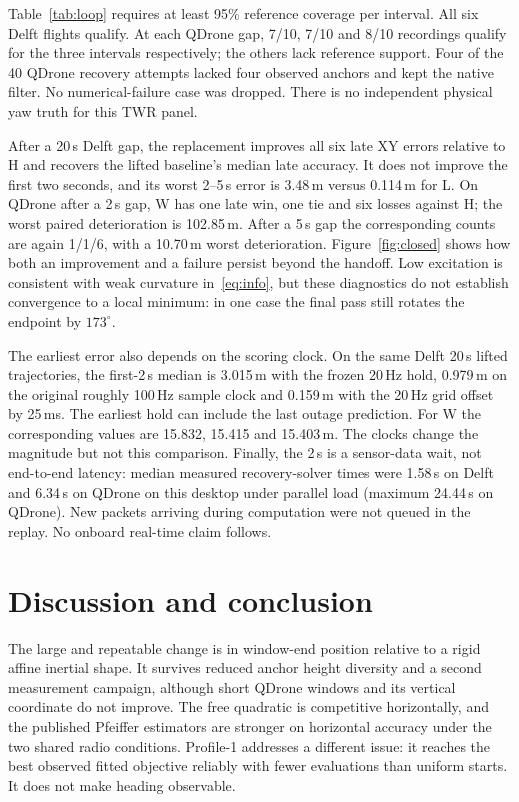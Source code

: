 \documentclass[conference,letterpaper,10pt]{IEEEtran}
\begin{document}
Table~\ref{tab:loop} requires at least 95\% reference coverage per interval. All six Delft flights qualify. At each QDrone gap, 7/10, 7/10 and 8/10 recordings qualify for the three intervals respectively; the others lack reference support. Four of the 40 QDrone recovery attempts lacked four observed anchors and kept the native filter. No numerical-failure case was dropped. There is no independent physical yaw truth for this TWR panel.

After a 20\,s Delft gap, the replacement improves all six late XY errors relative to H and recovers the lifted baseline's median late accuracy. It does not improve the first two seconds, and its worst 2--5\,s error is 3.48\,m versus 0.114\,m for L. On QDrone after a 2\,s gap, W has one late win, one tie and six losses against H; the worst paired deterioration is 102.85\,m. After a 5\,s gap the corresponding counts are again 1/1/6, with a 10.70\,m worst deterioration. Figure~\ref{fig:closed} shows how both an improvement and a failure persist beyond the handoff. Low excitation is consistent with weak curvature in~\eqref{eq:info}, but these diagnostics do not establish convergence to a local minimum: in one case the final pass still rotates the endpoint by $173^\circ$.

The earliest error also depends on the scoring clock. On the same Delft 20\,s lifted trajectories, the first-2\,s median is 3.015\,m with the frozen 20\,Hz hold, 0.979\,m on the original roughly 100\,Hz sample clock and 0.159\,m with the 20\,Hz grid offset by 25\,ms. The earliest hold can include the last outage prediction. For W the corresponding values are 15.832, 15.415 and 15.403\,m. The clocks change the magnitude but not this comparison. Finally, the 2\,s is a sensor-data wait, not end-to-end latency: median measured recovery-solver times were 1.58\,s on Delft and 6.34\,s on QDrone on this desktop under parallel load (maximum 24.44\,s on QDrone). New packets arriving during computation were not queued in the replay. No onboard real-time claim follows.

\section{Discussion and conclusion}
The large and repeatable change is in window-end position relative to a rigid affine inertial shape. It survives reduced anchor height diversity and a second measurement campaign, although short QDrone windows and its vertical coordinate do not improve. The free quadratic is competitive horizontally, and the published Pfeiffer estimators are stronger on horizontal accuracy under the two shared radio conditions. Profile-1 addresses a different issue: it reaches the best observed fitted objective reliably with fewer evaluations than uniform starts. It does not make heading observable.
\end{document}
